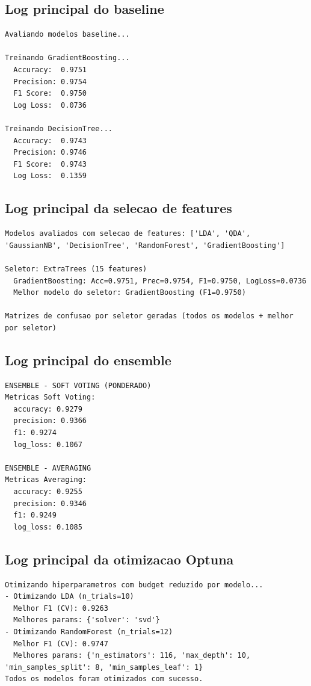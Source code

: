 \documentclass[12pt,a4paper]{article}
\begin{document}
\subsection{Log principal do baseline}
\begin{lstlisting}[style=plainlog]
Avaliando modelos baseline...

Treinando GradientBoosting...
  Accuracy:  0.9751
  Precision: 0.9754
  F1 Score:  0.9750
  Log Loss:  0.0736

Treinando DecisionTree...
  Accuracy:  0.9743
  Precision: 0.9746
  F1 Score:  0.9743
  Log Loss:  0.1359
\end{lstlisting}

\subsection{Log principal da selecao de features}
\begin{lstlisting}[style=plainlog]
Modelos avaliados com selecao de features: ['LDA', 'QDA', 'GaussianNB', 'DecisionTree', 'RandomForest', 'GradientBoosting']

Seletor: ExtraTrees (15 features)
  GradientBoosting: Acc=0.9751, Prec=0.9754, F1=0.9750, LogLoss=0.0736
  Melhor modelo do seletor: GradientBoosting (F1=0.9750)

Matrizes de confusao por seletor geradas (todos os modelos + melhor por seletor)
\end{lstlisting}

\subsection{Log principal do ensemble}
\begin{lstlisting}[style=plainlog]
ENSEMBLE - SOFT VOTING (PONDERADO)
Metricas Soft Voting:
  accuracy: 0.9279
  precision: 0.9366
  f1: 0.9274
  log_loss: 0.1067

ENSEMBLE - AVERAGING
Metricas Averaging:
  accuracy: 0.9255
  precision: 0.9346
  f1: 0.9249
  log_loss: 0.1085
\end{lstlisting}

\subsection{Log principal da otimizacao Optuna}
\begin{lstlisting}[style=plainlog]
Otimizando hiperparametros com budget reduzido por modelo...
- Otimizando LDA (n_trials=10)
  Melhor F1 (CV): 0.9263
  Melhores params: {'solver': 'svd'}
- Otimizando RandomForest (n_trials=12)
  Melhor F1 (CV): 0.9747
  Melhores params: {'n_estimators': 116, 'max_depth': 10, 'min_samples_split': 8, 'min_samples_leaf': 1}
Todos os modelos foram otimizados com sucesso.
\end{lstlisting}
\end{document}
